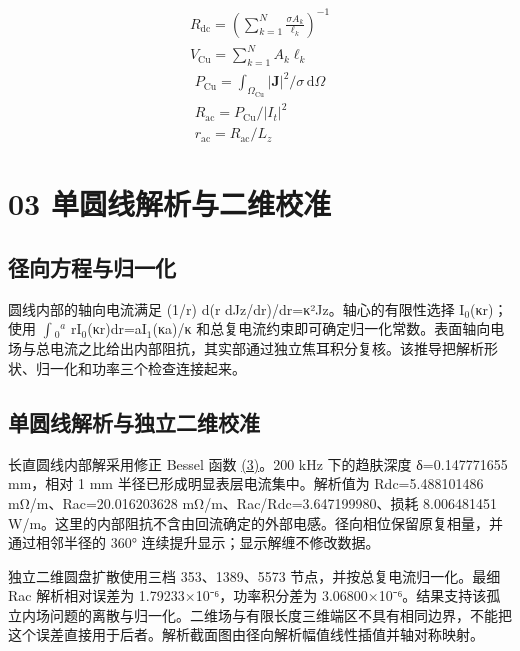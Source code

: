 \documentclass[11pt]{article}
\begin{document}
\hypertarget{E01}{}
\begin{equation}
\begin{gathered}
R_{\mathrm{dc}}=\left(\sum_{k=1}^{N}\frac{\sigma A_k}{\ell_k}\right)^{-1} \\
V_{\mathrm{Cu}}=\sum_{k=1}^{N}A_k\ell_k
\end{gathered}
\tag{1}\label{eq:E01}
\end{equation}
\hypertarget{E02}{}
\begin{equation}
\begin{gathered}
P_{\mathrm{Cu}}=\int_{\Omega_{\mathrm{Cu}}}|\mathbf J|^2/\sigma\,\mathrm d\Omega \\
R_{\mathrm{ac}}=P_{\mathrm{Cu}}/|I_t|^2 \\
r_{\mathrm{ac}}=R_{\mathrm{ac}}/L_z
\end{gathered}
\tag{2}\label{eq:E02}
\end{equation}
\FloatBarrier
\section*{03 单圆线解析与二维校准}
\hypertarget{chapter-03}{}
\subsection*{径向方程与归一化}
\hypertarget{03.round_derivation.heading}{}
圆线内部的轴向电流满足 (1/r) d(r dJz/dr)/dr=κ²Jz。轴心的有限性选择 I\(_0\)(κr)；使用 \(\int\)\(_0\)\(^a\) rI\(_0\)(κr)dr=aI\(_1\)(κa)/κ 和总复电流约束即可确定归一化常数。表面轴向电场与总电流之比给出内部阻抗，其实部通过独立焦耳积分复核。该推导把解析形状、归一化和功率三个检查连接起来。


\subsection*{单圆线解析与独立二维校准}
\hypertarget{03.analytic.heading}{}
长直圆线内部解采用修正 Bessel 函数 \href{report_zh-CN_single.pdf#E03}{(3)}。200 kHz 下的趋肤深度 δ=0.147771655 mm，相对 1 mm 半径已形成明显表层电流集中。解析值为 Rdc=5.488101486 mΩ/m、Rac=20.016203628 mΩ/m、Rac/Rdc=3.647199980、损耗 8.006481451 W/m。这里的内部阻抗不含由回流确定的外部电感。径向相位保留原复相量，并通过相邻半径的 360° 连续提升显示；显示解缠不修改数据。


独立二维圆盘扩散使用三档 353、1389、5573 节点，并按总复电流归一化。最细 Rac 解析相对误差为 1.79233×10⁻⁶，功率积分差为 3.06800×10⁻⁶。结果支持该孤立内场问题的离散与归一化。二维场与有限长度三维端区不具有相同边界，不能把这个误差直接用于后者。解析截面图由径向解析幅值线性插值并轴对称映射。
\end{document}
